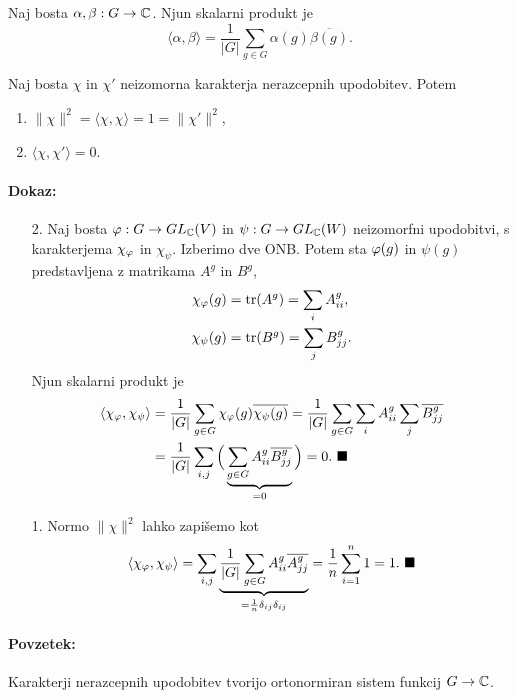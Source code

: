 \begin{defin}
	Naj bosta $\alpha, \beta : G \to \mathbb{C}$. Njun skalarni produkt je
	\[
		\langle \alpha, \beta \rangle = \frac{1}{|G|}\sum_{g \in G} \alpha(g)\overline{\beta(g)}.
	\]
\end{defin}
\pagebreak
\begin{trditev}
	Naj bosta $\chi$ in $\chi'$ neizomorna karakterja nerazcepnih upodobitev. Potem
	\begin{enumerate}
		\item{$\|\chi\|^2 = \langle \chi, \chi \rangle = 1 = \|\chi'\|^2$,}
		\item{$\langle \chi, \chi' \rangle = 0$.}
	\end{enumerate}
\end{trditev}

\paragraph{Dokaz:}
\begin{itemize}
	\item[2.]{Naj bosta $\varphi : G \to GL_{\mathbb{C}}(V)$ in $\psi : G \to GL_{\mathbb{C}}(W)$ neizomorfni upodobitvi, s karakterjema $\chi_{\varphi}$ in
		$\chi_\psi$. Izberimo dve ONB. Potem sta $\varphi(g)$ in $\psi(g)$ predstavljena z matrikama $A^g$ in $B^g$,
		\begin{align*}
			\chi_{\varphi}(g) &= \operatorname{tr}(A^g) = \sum_i A^g_{ii}, \\
			\chi_\psi(g) &= \operatorname{tr}(B^g) = \sum_j B^g_{jj}.
		\end{align*}
		Njun skalarni produkt je
		\begin{align*}
			\langle \chi_{\varphi}, \chi_\psi \rangle &= \frac{1}{|G|}\sum_{g \in G} \chi_{\varphi}(g)\overline{\chi_\psi(g)} =
				\frac{1}{|G|}\sum_{g \in G}\sum_i A^g_{ii} \sum_j \overline{B^g_{jj}} \\
			&= \frac{1}{|G|}\sum_{i,j}\Big(\underbrace{\sum_{g\in G} A^g_{ii} \overline{B^g_{jj}}}_{= 0}\Big) = 0.\ \blacksquare
		\end{align*}}
	\item[1.]{Normo $\|\chi\|^2$ lahko zapi\v semo kot
		\[
			\langle \chi_{\varphi}, \chi_\psi \rangle = \sum_{i,j} \underbrace{\frac{1}{|G|}\sum_{g \in G}A^g_{ii}\overline{A^g_{jj}}}_{
				= \frac{1}{n}\delta_{ij}\delta_{ij}} = \frac{1}{n}\sum_{i = 1}^n 1 = 1.\ \blacksquare
		\]}
\end{itemize}

\paragraph{Povzetek:} Karakterji nerazcepnih upodobitev tvorijo ortonormiran sistem funkcij $G \to \mathbb{C}$.

